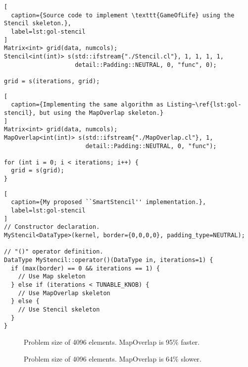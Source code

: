 \lstset{language=C++}
\begin{lstlisting}[
  caption={Source code to implement \texttt{GameOfLife} using the Stencil skeleton.},
  label=lst:gol-stencil
]
Matrix<int> grid(data, numcols);
Stencil<int(int)> s(std::ifstream{"./Stencil.cl"}, 1, 1, 1, 1,
                    detail::Padding::NEUTRAL, 0, "func", 0);

grid = s(iterations, grid);
\end{lstlisting}

\lstset{language=C++}
\begin{lstlisting}[
  caption={Implementing the same algorithm as Listing~\ref{lst:gol-stencil}, but using the MapOverlap skeleton.}
]
Matrix<int> grid(data, numcols);
MapOverlap<int(int)> s(std::ifstream{"./MapOverlap.cl"}, 1,
                       detail::Padding::NEUTRAL, 0, "func");

for (int i = 0; i < iterations; i++) {
  grid = s(grid);
}
\end{lstlisting}

\newpage
\lstset{language=C++}
\begin{lstlisting}[
  caption={My proposed ``SmartStencil'' implementation.},
  label=lst:gol-stencil
]
// Constructor declaration.
MyStencil<DataType>(kernel, border={0,0,0,0}, padding_type=NEUTRAL);

// "()" operator definition.
DataType MyStencil::operator()(DataType in, iterations=1) {
  if (max(border) == 0 && iterations == 1) {
    // Use Map skeleton
  } else if (iterations < TUNABLE_KNOB) {
    // Use MapOverlap skeleton
  } else {
    // Use Stencil skeleton
  }
}
\end{lstlisting}

\begin{figure}


\caption{Problem size of 4096 elements. MapOverlap is 95\% faster.}
\label{fig:}
\end{figure}

\begin{figure}


\caption{Problem size of 4096 elements. MapOverlap is 64\% slower.}
\label{fig:}
\end{figure}

